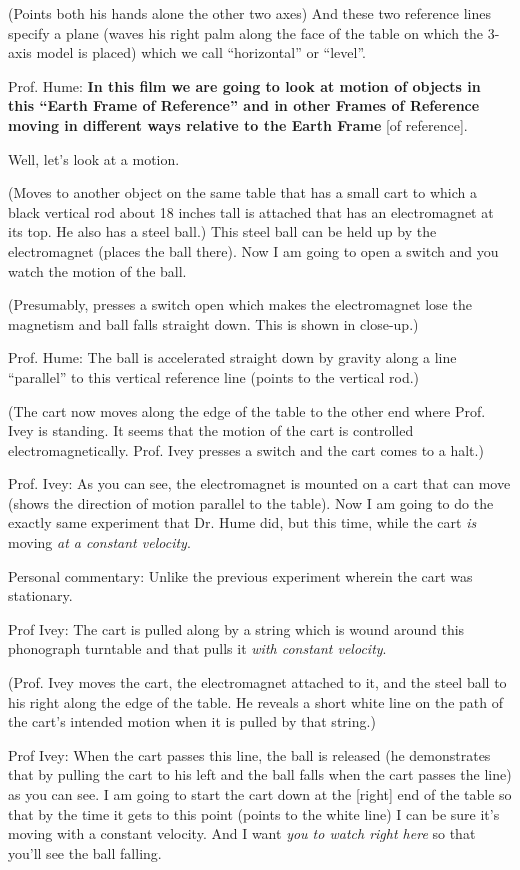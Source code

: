 \documentclass[a6paper]{article}
\begin{document}
(Points both his hands alone the other two axes) And these two reference lines specify a plane (waves his right palm along the face of the table on which the 3-axis model is placed) which we call ``horizontal'' or ``level''. 

Prof. Hume: \textbf{In this film we are going to look at motion of objects in this ``Earth Frame of Reference'' and in other Frames of Reference moving in different ways relative to the Earth Frame} [of reference].

Well, let's look at a motion.

(Moves to another object on the same table that has a small cart to which a black vertical rod about 18 inches tall is attached that has an electromagnet at its top. He also has a steel ball.) This steel ball can be held up by the electromagnet (places the ball there). Now I am going to open a switch and you watch the motion of the ball.

(Presumably, presses a switch open which makes the electromagnet lose the magnetism and ball falls straight down. This is shown in close-up.)

Prof. Hume: The ball is accelerated straight down by gravity along a line ``parallel'' to this vertical reference line (points to the vertical rod.) 

(The cart now moves along the edge of the table to the other end where Prof. Ivey is standing. It seems that the motion of the cart is controlled electromagnetically. Prof. Ivey presses a switch and the cart comes to a halt.)

Prof. Ivey: As you can see, the electromagnet is mounted on a cart that can move (shows the direction of motion parallel to the table). Now I am going to do the exactly same experiment that Dr. Hume did, but this time, while the cart \emph{is} moving \emph{at a constant velocity}.

Personal commentary: Unlike the previous experiment wherein the cart was stationary. 

Prof Ivey: The cart is pulled along by a string which is wound around this phonograph turntable and that pulls it \emph{with constant velocity}.

(Prof. Ivey moves the cart, the electromagnet attached to it, and the steel ball to his right along the edge of the table. He reveals a short white line on the path of the cart's intended motion when it is pulled by that string.)

Prof Ivey: When the cart passes this line, the ball is released (he demonstrates that by pulling the cart to his left and the ball falls when the cart passes the line) as you can see. I am going to start the cart down at the [right] end of the table so that by the time it gets to this point (points to the white line) I can be sure it's moving with a constant velocity. And I want \emph{you to watch right here} so that you'll see the ball falling. 
\end{document}
